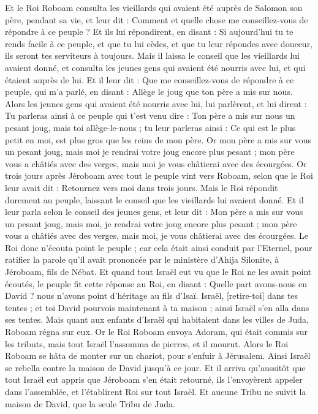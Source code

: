 \begin{multicols}{2}
Et le Roi Roboam consulta les vieillards qui avaient été auprès de Salomon son père, pendant sa vie, et leur dit : Comment et quelle chose me conseillez-vous de répondre à ce peuple ?
Et ils lui répondirent, en disant : Si aujourd'hui tu te rends facile à ce peuple, et que tu lui cèdes, et que tu leur répondes avec douceur, ils seront tes serviteurs à toujours.
Mais il laissa le conseil que les vieillards lui avaient donné, et consulta les jeunes gens qui avaient été nourris avec lui, et qui étaient auprès de lui.
Et il leur dit : Que me conseillez-vous de répondre à ce peuple, qui m'a parlé, en disant : Allège le joug que ton père a mis sur nous.
Alors les jeunes gens qui avaient été nourris avec lui, lui parlèrent, et lui dirent : Tu parleras ainsi à ce peuple qui t'est venu dire : Ton père a mis sur nous un pesant joug, mais toi allège-le-nous ; tu leur parleras ainsi : Ce qui est le plus petit en moi, est plus gros que les reins de mon père.
Or mon père a mis sur vous un pesant joug, mais moi je rendrai votre joug encore plus pesant ; mon père vous a châtiés avec des verges, mais moi je vous châtierai avec des écourgées.
Or trois jours après Jéroboam avec tout le peuple vint vers Roboam, selon que le Roi leur avait dit : Retournez vers moi dans trois jours.
Mais le Roi répondit durement au peuple, laissant le conseil que les vieillards lui avaient donné.
Et il leur parla selon le conseil des jeunes gens, et leur dit : Mon père a mis sur vous un pesant joug, mais moi, je rendrai votre joug encore plus pesant ; mon père vous a châtiés avec des verges, mais moi, je vous châtierai avec des écourgées.
Le Roi donc n'écouta point le peuple ; car cela était ainsi conduit par l'Eternel, pour ratifier la parole qu'il avait prononcée par le ministère d'Ahija Silonite, à Jéroboam, fils de Nébat.
Et quand tout Israël eut vu que le Roi ne les avait point écoutés, le peuple fit cette réponse au Roi, en disant : Quelle part avons-nous en David ? nous n'avons point d'héritage au fils d'Isaï. Israël, [retire-toi] dans tes tentes ; et toi David pourvois maintenant à ta maison ; ainsi Israël s'en alla dans ses tentes.
Mais quant aux enfants d'Israël qui habitaient dans les villes de Juda, Roboam régna sur eux.
Or le Roi Roboam envoya Adoram, qui était commis sur les tributs, mais tout Israël l'assomma de pierres, et il mourut. Alors le Roi Roboam se hâta de monter sur un chariot, pour s'enfuir à Jérusalem.
Ainsi Israël se rebella contre la maison de David jusqu'à ce jour.
Et il arriva qu'aussitôt que tout Israël eut appris que Jéroboam s'en était retourné, ils l'envoyèrent appeler dans l'assemblée, et l'établirent Roi sur tout Israël. Et aucune Tribu ne suivit la maison de David, que la seule Tribu de Juda.

\end{multicols}
